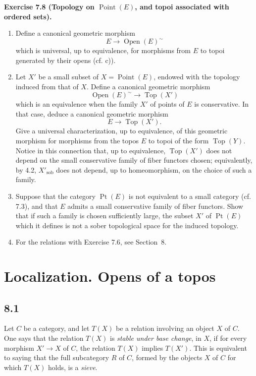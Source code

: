 \documentclass[11pt]{article}
\newcommand{\Top}{\operatorname{Top}}
\newcommand{\Ouv}{\operatorname{Open}}
\newcommand{\Point}{\operatorname{Point}}
\newcommand{\Ppoint}{\operatorname{Pt}}
\newcommand{\sob}{\operatorname{sob}}
\newenvironment{remarktext}[1]{\par\medskip\noindent\textbf{#1.}\ }{\par\medskip}
\begin{document}
\begin{remarktext}{Exercise 7.8 (Topology on \(\Point(E)\), and topoi associated with ordered sets)}
\begin{enumerate}[label=\alph*)]
\item Define a canonical geometric morphism
\[
E\longrightarrow\Ouv(E)^{\sim}
\]
which is universal, up to equivalence, for morphisms from \(E\) to topoi generated by their opens (cf. c)).

\item Let \(X'\) be a small subset of \(X=\Point(E)\), endowed with the topology induced from that of \(X\). Define a canonical geometric morphism
\[
\Ouv(E)^{\sim}\longrightarrow\Top(X')
\]
which is an equivalence when the family \(X'\) of points of \(E\) is conservative. In that case, deduce a canonical geometric morphism
\[
E\longrightarrow\Top(X').
\]
Give a universal characterization, up to equivalence, of this geometric morphism for morphisms from the topos \(E\) to topoi of the form \(\Top(Y)\). Notice in this connection that, up to equivalence, \(\Top(X')\) does not depend on the small conservative family of fiber functors chosen; equivalently, by 4.2, \(X'_{\sob}\) does not depend, up to homeomorphism, on the choice of such a family.

\item Suppose that the category \(\Ppoint(E)\) is not equivalent to a small category (cf. 7.3), and that \(E\) admits a small conservative family of fiber functors. Show that if such a family is chosen sufficiently large, the subset \(X'\) of \(\Ppoint(E)\) which it defines is not a sober topological space for the induced topology.

\item For the relations with Exercise 7.6, see Section~8.
\end{enumerate}
\end{remarktext}

\section{Localization. Opens of a topos}

\subsection*{8.1}
Let \(C\) be a category, and let \(T(X)\) be a relation involving an object \(X\) of \(C\). One says that the relation \(T(X)\) is \emph{stable under base change}, in \(X\), if for every morphism \(X'\to X\) of \(C\), the relation \(T(X)\) implies \(T(X')\). This is equivalent to saying that the full subcategory \(R\) of \(C\), formed by the objects \(X\) of \(C\) for which \(T(X)\) holds, is a \emph{sieve}.
\end{document}
